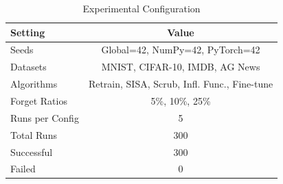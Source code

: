 \begin{table}[t]
\centering
\caption{Experimental Configuration}
\label{tab:experimental_config}
\small
\begin{tabular}{l c}
\toprule
Setting & Value \\
\midrule
Seeds & Global=42, NumPy=42, PyTorch=42 \\
Datasets & MNIST, CIFAR-10, IMDB, AG News \\
Algorithms & Retrain, SISA, Scrub, Infl. Func., Fine-tune \\
Forget Ratios & 5\%, 10\%, 25\% \\
Runs per Config & 5 \\
Total Runs & 300 \\
Successful & 300 \\
Failed & 0 \\
\bottomrule
\end{tabular}
\end{table}
